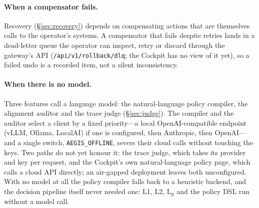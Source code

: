 \paragraph{When a compensator fails.}
Recovery (\S\ref{sec:recovery}) depends on compensating actions that are
themselves calls to the operator's systems. A compensator that fails
despite retries lands in a dead-letter queue the operator can inspect, retry or discard through the gateway's API (\texttt{/api/v1/rollback/dlq}; the Cockpit has no view of it yet), so a failed undo is a recorded item, not a silent inconsistency.

\paragraph{When there is no model.}
Three features call a language model: the natural-language policy compiler, the alignment auditor and the trace judge (\S\ref{sec:judge}). The compiler and the auditor select a client by a fixed priority---a local OpenAI-compatible endpoint (vLLM, Ollama, LocalAI) if one is configured, then Anthropic, then OpenAI---and a single switch, \texttt{AEGIS\_OFFLINE}, severs their cloud calls without touching the keys. Two paths do not yet honour it: the trace judge, which takes its provider and key per request, and the Cockpit's own natural-language policy page, which calls a cloud API directly; an air-gapped deployment leaves both unconfigured. With no model at all the
policy compiler falls back to a heuristic backend, and the decision
pipeline itself never needed one: L1, L2, L$_\mathrm{p}$ and the policy
DSL run without a model call.
